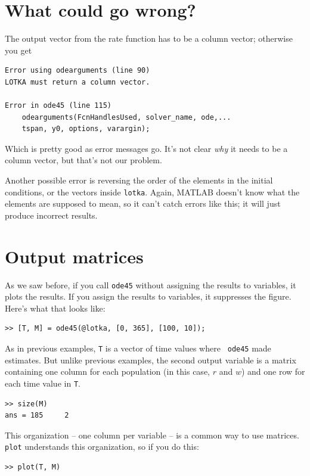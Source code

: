\documentclass[
]{book}
\begin{document}
\section{What could go wrong?}

The output vector from the rate function
has to be a column vector; otherwise you get

\begin{verbatim}
Error using odearguments (line 90)
LOTKA must return a column vector.

Error in ode45 (line 115)
    odearguments(FcnHandlesUsed, solver_name, ode,...
    tspan, y0, options, varargin);
\end{verbatim}

Which is pretty good as error messages go.  It's not clear {\em why}
it needs to be a column vector, but that's not our problem.

Another possible error is reversing the order of the elements in the
initial conditions, or the vectors inside {\tt lotka}.  Again, MATLAB
doesn't know what the elements are supposed to mean, so it can't catch
errors like this; it will just produce incorrect results.


\section{Output matrices}

As we saw before, if you call {\tt ode45} without assigning the
results to variables, it plots the results.
If you assign
the results to variables, it suppresses the figure.
Here's what that looks like:

\begin{verbatim}
>> [T, M] = ode45(@lotka, [0, 365], [100, 10]);
\end{verbatim}

As in previous examples, {\tt T} is a vector of time values where {\tt
ode45} made estimates.  But unlike previous examples, the
second output variable is a matrix containing one column for each
population (in this case, $r$ and $w$) and one row for each time value in {\tt T}.

\begin{verbatim}
>> size(M)
ans = 185     2
\end{verbatim}

This organization -- one column per variable -- is a common way to
use matrices.  {\tt plot} understands this organization, so if you
do this:

\begin{verbatim}
>> plot(T, M)
\end{verbatim}
\end{document}
